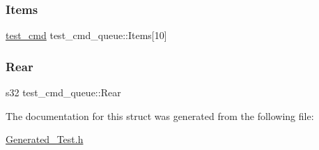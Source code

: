 \subsubsection{\texorpdfstring{Items}{Items}}
{\footnotesize\ttfamily \hyperlink{PreprocTest_8h_a55ed691059222a58555cf9992ec14431}{test\+\_\+cmd} test\+\_\+cmd\+\_\+queue\+::\+Items\mbox{[}10\mbox{]}}

\mbox{\label{structtest__cmd__queue_a7cedef36f33507cbadf3f4ef95aa7cec}} 
\subsubsection{\texorpdfstring{Rear}{Rear}}
{\footnotesize\ttfamily s32 test\+\_\+cmd\+\_\+queue\+::\+Rear}



The documentation for this struct was generated from the following file\+:\begin{DoxyCompactItemize}
\item 
\hyperlink{Generated__Test_8h}{Generated\+\_\+\+Test.\+h}\end{DoxyCompactItemize}
